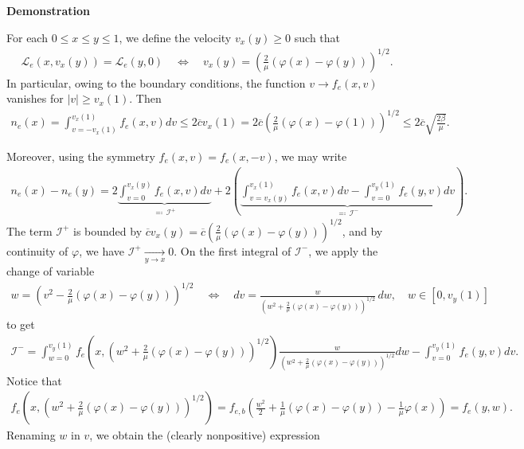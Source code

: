 \documentclass{article}
\numberwithin{equation}{section}
\newcommand{\myproof}[1]{
	\noindent \textbf{Demonstration}
	{\small	#1 \hfill \qedsymbol}
}
\newcommand{\maxfe}{{\overline{c}}} %
\begin{document}
\myproof{
	For each $0\leqslant x \leqslant y \leqslant 1$, we define the velocity $v_x(y) \geqslant 0$ such that 
	\begin{align*}
		\mathcal{L}_e(x,v_x(y)) = \mathcal{L}_e(y,0) \quad \iff \quad v_x(y) = \left(\frac{2}{\mu}\left(\varphi(x) - \varphi(y)\right)\right)^{1/2}.
	\end{align*} 
	In particular, owing to the boundary conditions, the function $v \to f_e(x,v)$ vanishes for $|v| \geqslant v_x(1)$. Then
	\begin{align*}
		n_e(x) = \int_{v=-v_x(1)}^{v_x(1)} f_e(x,v) dv \leqslant 2 \maxfe v_x(1) = 2 \maxfe \left(\frac{2}{\mu} (\varphi(x) - \varphi(1))\right)^{1/2} \leqslant 2 \maxfe \sqrt{\frac{2\beta}{\mu}}.
	\end{align*}
	
	Moreover, using the symmetry $f_e(x,v) = f_e(x,-v)$, we may write
	\begin{align*}
		n_e(x) - n_e(y) = 2 \underbrace{\int_{v=0}^{v_x(y)} f_e(x,v) dv}_{\eqqcolon\,\mathcal{I}^+} + 2 \left(\underbrace{\int_{v=v_x(y)}^{v_x(1)}  f_e(x,v) dv - \int_{v=0}^{v_y(1)} f_e(y,v) dv}_{\eqqcolon\,\mathcal{I}^-}\right).
	\end{align*}
	The term $\mathcal{I}^+$ is bounded by $\maxfe v_x(y) = \maxfe \left(\frac{2}{\mu}\left(\varphi(x) - \varphi(y)\right)\right)^{1/2}$, and by continuity of $\varphi$, we have $\mathcal{I}^{+} \underset{y\to x}{\longrightarrow} 0$. On the first integral of $\mathcal{I}^{-}$, we apply the change of variable
	\begin{align*}
		w = \left(v^2 - \frac{2}{\mu} \left(\varphi(x) - \varphi(y)\right)\right)^{1/2} \quad \iff \quad dv = \frac{w}{\left(w^2 + \frac{2}{\mu}\left(\varphi(x) - \varphi(y)\right)\right)^{1/2}} \,dw, \quad w \in [0,v_y(1)]
	\end{align*}
	to get
	\begin{align*}
		\mathcal{I}^- = \int_{w=0}^{v_y(1)} f_e\left(x,\left(w^2 + \frac{2}{\mu}\left(\varphi(x) - \varphi(y)\right)\right)^{1/2}\right) \frac{w}{\left(w^2 + \frac{2}{\mu}\left(\varphi(x) - \varphi(y)\right)\right)^{1/2}} dw - \int_{v=0}^{v_y(1)} f_e(y,v) dv.
	\end{align*}
	Notice that
	\begin{align*}
		f_e\left(x,\left(w^2 + \frac{2}{\mu}\left(\varphi(x) - \varphi(y)\right)\right)^{1/2}\right)
		= f_{e,b} \left(\frac{w^2}{2} + \frac{1}{\mu}\left(\varphi(x) - \varphi(y)\right) - \frac{1}{\mu} \varphi(x)\right)
		= f_e(y,w).
	\end{align*}
	Renaming $w$ in $v$, we obtain the (clearly nonpositive) expression
}
\end{document}

